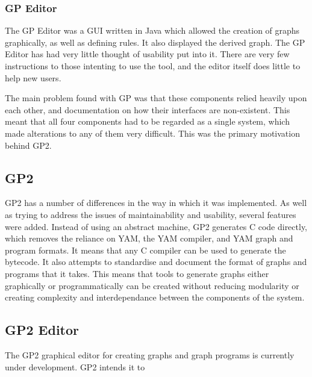 \documentclass{UoYCSproject}
\begin{document}
\subsubsection{GP Editor}
The GP Editor was a GUI written in Java which allowed the creation of graphs graphically, as well as defining rules. It also displayed the derived graph.
The GP Editor has had very little thought of usability put into it. There are very few instructions to those intenting to use the tool, and the editor itself does little to help new users.

The main problem found with GP was that these components relied heavily upon each other, and documentation on how their interfaces are non-existent. %
This meant that all four components had to be regarded as a single system, which made alterations to any of them very difficult. This was the primary motivation behind GP2.

\subsection{GP2}

GP2 has a number of differences in the way in which it was implemented. As well as trying to address the issues of maintainability and usability, several features were added.
Instead of using an abstract machine, GP2 generates C code directly, which removes the reliance on YAM, the YAM compiler, and YAM graph and program formats. It means that any C compiler can be used to generate the bytecode. It also attempts to standardise and document the format of graphs and programs that it takes. This means that tools to generate graphs either graphically or programmatically can be created without reducing modularity or creating complexity and interdependance between the components of the system. %


\subsection{GP2 Editor}
The GP2 graphical editor for creating graphs and graph programs is currently under development. GP2 intends it to 
\end{document}
